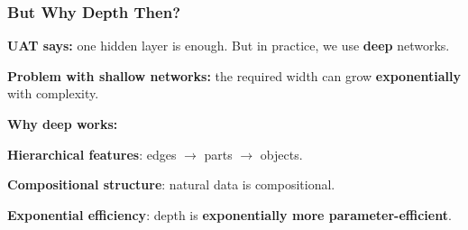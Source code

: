 \documentclass[notes,11pt, aspectratio=169]{beamer}
\newenvironment{wideitemize}{\itemize\addtolength{\itemsep}{10pt}}{\enditemize}
\begin{document}
\begin{frame}
\frametitle{But Why Depth Then?}

\textbf{UAT says:} one hidden layer is enough. But in practice, we use \textbf{deep} networks.

\vspace{6pt}
\textbf{Problem with shallow networks:} the required width can grow \textbf{exponentially} with complexity.

\vspace{6pt}

\vspace{8pt}
\textbf{Why deep works:}
\begin{wideitemize}
    \item \textbf{Hierarchical features}: edges $\to$ parts $\to$ objects.
    \item \textbf{Compositional structure}: natural data is compositional.
    \item \textbf{Exponential efficiency}: depth is \textbf{exponentially more parameter-efficient}.
\end{wideitemize}
\end{frame}
\end{document}

